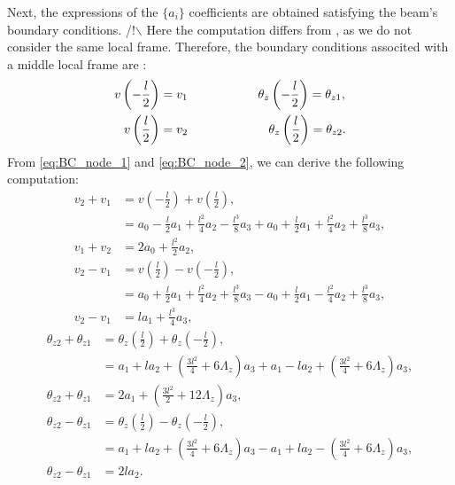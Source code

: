 \documentclass[a4paper,11pt]{article}
\begin{document}
\noindent Next, the expressions of the $\{a_i\}$ coefficients are obtained
satisfying the beam's boundary conditions. /!$\backslash$ Here the computation
differs from \cite{Baz03}, as we do not consider the same local frame.
Therefore, the boundary conditions associted with a middle local frame are :
\begin{align}
v\left(-\frac{l}{2}\right) & = v_1 \text{\hspace{20mm}} \theta_z \left(-\frac{l}{2}\right) = \theta_{z1}, \label{eq:BC_node_1} \\
v\left(\frac{l}{2}\right) & = v_2 \text{\hspace{23mm}} \theta_z \left(\frac{l}{2}\right) = \theta_{z2}. \label{eq:BC_node_2}
\end{align}
From \eqref{eq:BC_node_1} and \eqref{eq:BC_node_2}, we can derive the following
computation:
\begin{align}
v_2 + v_1 & = v\left(-\frac{l}{2}\right) + v\left(\frac{l}{2}\right), \nonumber \\
	& = a_0 - \frac{l}{2}a_1 + \frac{l^2}{4}a_2 - \frac{l^3}{8}a_3 + a_0 + \frac{l}{2}a_1 + \frac{l^2}{4}a_2 + \frac{l^3}{8}a_3, \nonumber \\
v_1 + v_2 & = 2a_0 + \frac{l^2}{2}a_2, \label{eq:BC1}
\end{align}
\begin{align}
v_2 - v_1 & = v\left(\frac{l}{2}\right) - v\left(-\frac{l}{2}\right), \nonumber \\
	& = a_0 + \frac{l}{2}a_1 + \frac{l^2}{4}a_2 + \frac{l^3}{8}a_3 - a_0 + \frac{l}{2}a_1 - \frac{l^2}{4}a_2 + \frac{l^3}{8}a_3, \nonumber \\
v_2 - v_1 & = la_1 + \frac{l^3}{4}a_3, \label{eq:BC2}
\end{align}
\begin{align}
\theta_{z2} + \theta_{z1} & = \theta_z \left(\frac{l}{2}\right) + \theta_z \left(-\frac{l}{2}\right), \nonumber \\
	& = a_1 + la_2 + \left( \frac{3l^2}{4} + 6\Lambda_z \right)a_3 + a_1 - la_2 + \left( \frac{3l^2}{4} + 6\Lambda_z \right)a_3, \nonumber \\
\theta_{z2} + \theta_{z1} & = 2a_1 + \left( \frac{3l^2}{2} + 12\Lambda_z \right)a_3, \label{eq:BC3}
\end{align}
\begin{align}
\theta_{z2} - \theta_{z1} & = \theta_z \left(\frac{l}{2}\right) - \theta_z \left(-\frac{l}{2}\right), \nonumber \\
	& = a_1 + la_2 + \left( \frac{3l^2}{4} + 6\Lambda_z \right)a_3 - a_1 + la_2 - \left( \frac{3l^2}{4} + 6\Lambda_z \right)a_3, \nonumber \\
\theta_{z2} - \theta_{z1} & = 2la_2. \label{eq:BC4}
\end{align}
\end{document}
